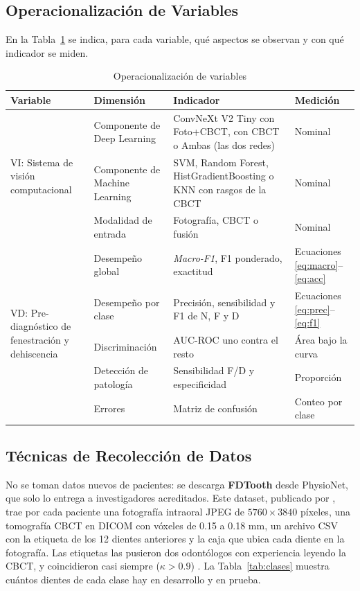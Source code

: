 \documentclass[12pt,a4paper]{article}
\newcommand{\dat}[1]{\textcolor{dataset}{\textbf{#1}}}
\newcommand{\dat}[1]{#1}
\newcommand{\fuente}[1]{\par\vspace{2pt}{\footnotesize Fuente: #1\par}}
\begin{document}
\subsection{Operacionalización de Variables}
En la Tabla~\ref{tab:operacionalizacion} se indica, para cada variable,
qué aspectos se observan y con qué indicador se miden.

\begin{table}[!htbp]
\caption{Operacionalización de variables}
\label{tab:operacionalizacion}
\singlespacing\small
\begin{tabularx}{\textwidth}{@{}p{2.8cm}XXp{3.2cm}@{}}
\toprule
Variable & Dimensión & Indicador & Medición \\
\midrule
\multirow{3}{2.8cm}{VI: Sistema de visión computacional}
 & Componente de Deep Learning & ConvNeXt V2 Tiny con Foto+CBCT, con CBCT o Ambas (las dos redes) & Nominal \\
 & Componente de Machine Learning & SVM, Random Forest, HistGradientBoosting o KNN con rasgos de la CBCT & Nominal \\
 & Modalidad de entrada & Fotografía, CBCT o fusión & Nominal \\
\midrule
\multirow{5}{2.8cm}{VD: Pre-diagnóstico de fenestración y dehiscencia}
 & Desempeño global & \textit{Macro-F1}, F1 ponderado, exactitud & Ecuaciones \ref{eq:macro}--\ref{eq:acc} \\
 & Desempeño por clase & Precisión, sensibilidad y F1 de N, F y D & Ecuaciones \ref{eq:prec}--\ref{eq:f1} \\
 & Discriminación & AUC-ROC uno contra el resto & Área bajo la curva \\
 & Detección de patología & Sensibilidad F/D y especificidad & Proporción \\
 & Errores & Matriz de confusión & Conteo por clase \\
\bottomrule
\end{tabularx}
\fuente{Elaboración propia.}
\end{table}

\subsection{Técnicas de Recolección de Datos}
No se toman datos nuevos de pacientes: se descarga \dat{FDTooth} desde
PhysioNet, que solo lo entrega a investigadores acreditados. Este dataset,
publicado por \textcite{liu2025fdtooth}, trae por cada paciente una
fotografía intraoral JPEG de $5760 \times 3840$ píxeles, una tomografía
CBCT en DICOM con vóxeles de 0.15 a 0.18 mm, un archivo CSV con la
etiqueta de los 12 dientes anteriores y la caja que ubica cada diente en
la fotografía. Las etiquetas las pusieron dos odontólogos con experiencia
leyendo la CBCT, y coincidieron casi siempre ($\kappa > 0.9$)
\parencite{liu2025fdtooth}. La Tabla~\ref{tab:clases} muestra cuántos
dientes de cada clase hay en desarrollo y en prueba.
\end{document}
